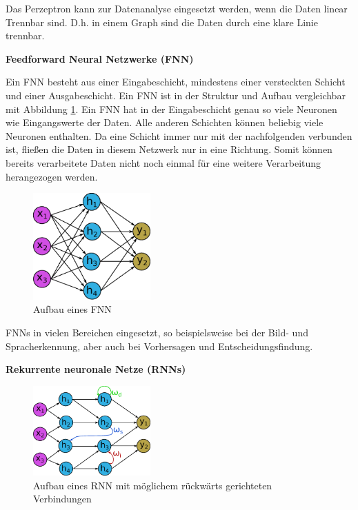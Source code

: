 Das Perzeptron kann zur Datenanalyse eingesetzt werden, wenn die Daten linear Trennbar sind. D.h. in einem Graph sind die Daten durch eine klare Linie trennbar.\vspace{0.2cm}

\textbf{Feedforward Neural Netzwerke (FNN)}\vspace{0.2cm}

Ein FNN besteht aus einer Eingabeschicht, mindestens einer versteckten Schicht und einer Ausgabeschicht. Ein FNN ist in der Struktur und Aufbau vergleichbar mit Abbildung \ref{img:neural_network_fnn}. Ein FNN hat in der Eingabeschicht genau so viele Neuronen wie Eingangswerte der Daten. Alle anderen Schichten können beliebig viele Neuronen enthalten. Da eine Schicht immer nur mit der nachfolgenden verbunden ist, fließen die Daten in diesem Netzwerk nur in eine Richtung. Somit können bereits verarbeitete Daten nicht noch einmal für eine weitere Verarbeitung herangezogen werden.

\begin{figure}[!ht]
	\includegraphics[width=0.4\textwidth]{content/chapter_basics/images/neuronal_network_fnn.eps}
	\centering
	\caption{Aufbau eines FNN}
	\label{img:neural_network_fnn}
\end{figure}

FNNs in vielen Bereichen eingesetzt, so beispielsweise bei der Bild- und Spracherkennung, aber auch bei Vorhersagen und Entscheidungsfindung.\vspace{0.2cm}

\textbf{Rekurrente neuronale Netze (RNNs)}\vspace{0.2cm}

\begin{figure}[!ht]
	\includegraphics[width=0.4\textwidth]{content/chapter_basics/images/neuronal_network_rnn.eps}
	\centering
	\caption{Aufbau eines RNN mit möglichem rückwärts gerichteten Verbindungen}
	\label{img:neural_network_rnn}
\end{figure}

